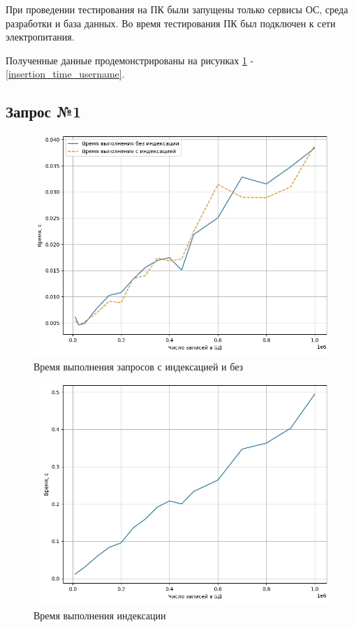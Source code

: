 При проведении тестирования на ПК были запущены только сервисы ОС, среда разработки и база данных. Во время тестирования ПК был подключен к сети электропитания.

Полученные данные продемонстрированы на рисунках \ref{indexing_both} - \ref{insertion_time_username}.


\subsection{Запрос №1}

\begin{figure}[H]
	\begin{center}
		\includegraphics[page=1,scale=0.8]{assets/indexing_both.png}
	\end{center}
	\caption{Время выполнения запросов с индексацией и без}
	\label{indexing_both}
\end{figure}

\begin{figure}[H]
	\begin{center}
		\includegraphics[page=1,scale=0.8]{assets/indexing_time.png}
	\end{center}
	\caption{Время выполнения индексации}
	\label{indexing_time}
\end{figure}

